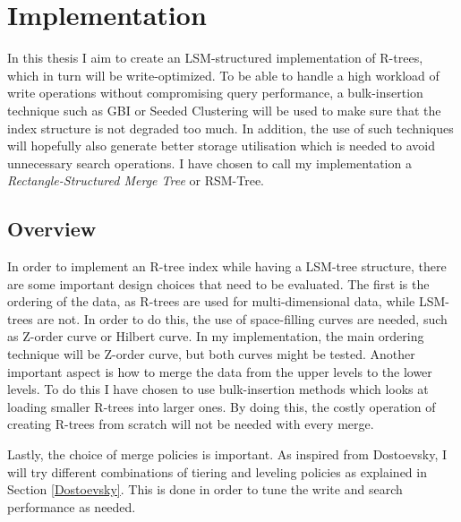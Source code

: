 \chapter{Implementation}

In this thesis I aim to create an LSM-structured implementation of R-trees, which in turn will be write-optimized. To be able to handle a high workload of write operations without compromising query performance, a bulk-insertion technique such as GBI\cite{GBI} or Seeded Clustering\cite{SeededClustering} will be used to make sure that the index structure is not degraded too much. In addition, the use of such techniques will hopefully also generate better storage utilisation which is needed to avoid unnecessary search operations. I have chosen to call my implementation a \emph{Rectangle-Structured Merge Tree} or RSM-Tree.

\section{Overview}
In order to implement an R-tree index while having a LSM-tree structure, there are some important design choices that need to be evaluated. The first is the ordering of the data, as R-trees are used for multi-dimensional data, while LSM-trees are not. In order to do this, the use of space-filling curves are needed, such as Z-order curve or Hilbert curve. In my implementation, the main ordering technique will be Z-order curve, but both curves might be tested. Another important aspect is how to merge the data from the upper levels to the lower levels. To do this I have chosen to use bulk-insertion methods which looks at loading smaller R-trees into larger ones. By doing this, the costly operation of creating R-trees from scratch will not be needed with every merge.\newline

Lastly, the choice of merge policies is important. As inspired from Dostoevsky\cite{Dostoevsky}, I will try different combinations of tiering and leveling policies as explained in Section \ref{Dostoevsky}. This is done in order to tune the write and search performance as needed.  

